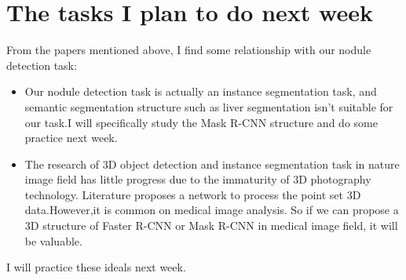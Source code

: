 \documentclass[twocolumn]{article}
\begin{document}
\section{The tasks I plan to do next week}
From the papers mentioned above, I find some relationship with our nodule detection task:
\begin{itemize}
\item Our nodule detection task is actually an instance segmentation task, and semantic segmentation structure such as liver segmentation isn't suitable for our task.I will specifically study the Mask R-CNN structure and do some practice next week.
\item The research of 3D object detection and instance segmentation task in nature image field has little progress due to the immaturity of 3D photography technology. Literature\cite{DBLP:journals/corr/QiSMG16} proposes a network to process the point set 3D data.However,it is common on medical image analysis. So if we can propose a 3D structure of Faster R-CNN or Mask R-CNN in medical image field, it will be valuable.
\end{itemize}
I will practice these ideals next week.


\end{document}
